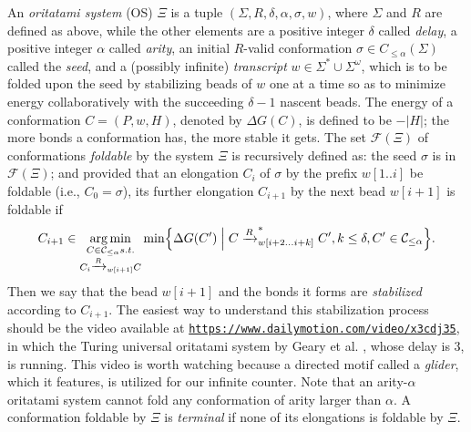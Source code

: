 \documentclass[twocolumn]{svjour3}
\DeclareMathOperator*{\argmin}{arg\,min}
\begin{document}
An \textit{oritatami system} (OS) $\Xi$ is a tuple $(\Sigma, R, \delta, \alpha, \sigma, w)$, where $\Sigma$ and $R$ are defined as above, while the other elements are
a positive integer $\delta$ called \textit{delay}, 
a positive integer $\alpha$ called \textit{arity},
an initial $R$-valid conformation $\sigma \in C_{\le \alpha}(\Sigma)$ called the \textit{seed},
and a (possibly infinite) \textit{transcript} $w \in \Sigma^* \cup \Sigma^\omega$, which is to be folded upon the seed by stabilizing beads of $w$ one at a time so as to minimize energy collaboratively with the succeeding $\delta{-}1$ nascent beads.
%
The energy of a conformation $C = (P, w, H)$, denoted by $\Delta G(C)$, is defined to be ${-}|H|$; the more bonds a conformation has, the more stable it gets. 
The set $\mathcal{F}(\Xi)$ of conformations \textit{foldable} by the system $\Xi$ is recursively defined as: the seed $\sigma$ is in $\mathcal{F}(\Xi)$; and provided that an elongation $C_i$ of $\sigma$ by the prefix $w[1..i]$ be foldable (i.e., $C_0 = \sigma$), its further elongation $C_{i+1}$ by the next bead $w[i+1]$ is foldable if 
\begin{equation}\label{eq:OS_CF}
C_{i+1} \in \argmin_{
\substack{
C \in \mathcal{C}_{\le \alpha} s.t. \\
C_i \xrightarrow{R}_{w[i+1]}C \\
}
}
\min \Bigl\{ \Delta G(C') \Bigm|
C \xrightarrow{R}^*_{w[i+2...i+k]}C', k\le \delta, C' \in \mathcal{C}_{\le \alpha}
\Bigr\}.
\end{equation}
%
Then we say that the bead $w[i+1]$ and the bonds it forms are \textit{stabilized} according to $C_{i+1}$. 
The easiest way to understand this stabilization process should be the video available at \href{https://www.dailymotion.com/video/x3cdj35}{\tt https://www.dailymotion.com/video/x3cdj35}, in which the Turing universal oritatami system by Geary et al. \cite{GeMeScSe2018}, whose delay is 3, is running.
This video is worth watching because a directed motif called a \textit{glider}, which it features, is utilized for our infinite counter.
Note that an arity-$\alpha$ oritatami system cannot fold any conformation of arity larger than $\alpha$. %
A conformation foldable by $\Xi$ is \textit{terminal} if none of its elongations is foldable by $\Xi$. 
\end{document}
